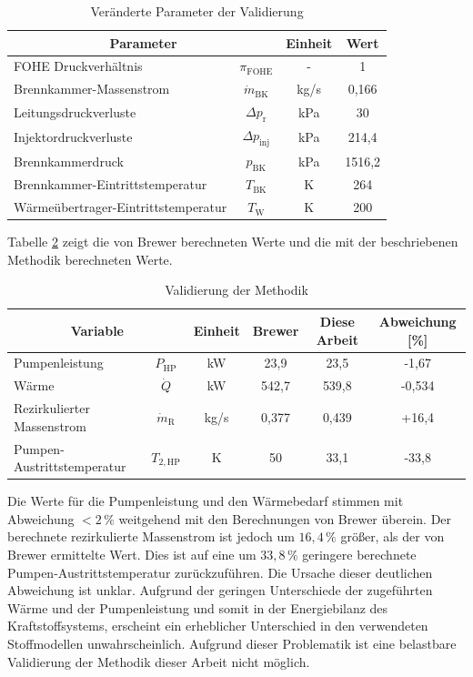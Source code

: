 \begin{table}[ht]
    \centering
	\caption{Veränderte Parameter der Validierung}
	\begin{tabular} {|l|c|c|c|} \hline%
    \multicolumn{2}{|c|}{Parameter} & Einheit & Wert\\ \hline\hline%
    FOHE Druckverhältnis & $\pi_\mathrm{FOHE}$ & - & 1 \\ \hline
    Brennkammer-Massenstrom & $\dot{m}_\mathrm{BK}$ & kg/s & 0,166 \\ \hline
    Leitungsdruckverluste & $\Delta p_\mathrm{r}$ & kPa & 30 \\ \hline
    Injektordruckverluste & $\Delta p_\mathrm{inj}$ & kPa & 214,4 \\ \hline
    Brennkammerdruck & $p_\mathrm{BK}$ & kPa & 1516,2 \\ \hline
    Brennkammer-Eintrittstemperatur & $T_\mathrm{BK}$ & K & 264 \\ \hline
    Wärmeübertrager-Eintrittstemperatur & $T_\mathrm{W}$ & K & 200 \\ \hline
    \end{tabular}	
    \label{Tab:brewer}%
\end{table}
\FloatBarrier 

Tabelle \ref{Tab:validation} zeigt die von Brewer berechneten Werte und die mit der beschriebenen Methodik berechneten Werte. 

\begin{table}[ht]
    \centering
	\caption{Validierung der Methodik}
	\begin{tabular} {|l|c|c|c|c|c|} \hline%
    \multicolumn{2}{|c|}{Variable} & Einheit & Brewer \cite{Brewer.1991} & Diese Arbeit & Abweichung [\%] \\ \hline\hline%
    Pumpenleistung & $P_\mathrm{HP}$ & kW & 23,9 & 23,5 & -1,67 \\ \hline
    Wärme & $\dot{Q}$ & kW & 542,7 & 539,8 & -0,534 \\ \hline
    Rezirkulierter Massenstrom & $\dot{m}_\mathrm{R}$ & kg/s & 0,377 & 0,439 & +16,4 \\ \hline
    Pumpen-Austrittstemperatur & $T_{2,\mathrm{HP}}$ & K & 50 & 33,1 & -33,8 \\ \hline
    \end{tabular}	
    \label{Tab:validation}%
\end{table}
\FloatBarrier 

Die Werte für die Pumpenleistung und den Wärmebedarf stimmen mit Abweichung $<2\,\%$ weitgehend mit den Berechnungen von Brewer überein. Der berechnete rezirkulierte Massenstrom ist jedoch um $16,4\,\%$ größer, als der von  Brewer ermittelte Wert. Dies ist auf eine um $33,8\,\%$ geringere berechnete Pumpen-Austrittstemperatur zurückzuführen. Die Ursache dieser deutlichen Abweichung ist unklar. Aufgrund der geringen Unterschiede der zugeführten Wärme und der Pumpenleistung und somit in der Energiebilanz des Kraftstoffsystems, erscheint ein erheblicher Unterschied in den verwendeten Stoffmodellen unwahrscheinlich. Aufgrund dieser Problematik ist eine belastbare Validierung der Methodik dieser Arbeit nicht möglich.

